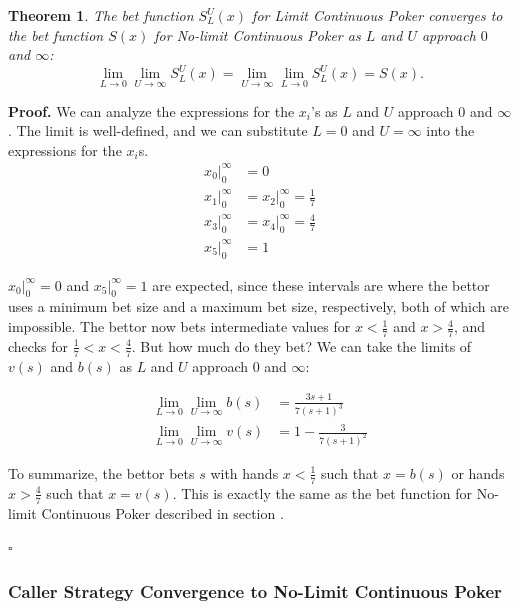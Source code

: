 \documentclass[a4paper,12pt]{article}
\theoremstyle{plain}
\newtheorem{theorem}{Theorem}[section]
\theoremstyle{definition}
\newenvironment{customproof}[1][Proof]{\noindent\textbf{#1.} }{\hfill$\square$\vspace{1em}}
\begin{document}
\begin{theorem}
    The bet function $S_L^U(x)$ for Limit Continuous Poker converges to the bet function $S(x)$ for No-limit Continuous Poker as $L$ and $U$ approach $0$ and $\infty$:
\[
\lim_{L \to 0} \lim_{U \to \infty} S_L^U(x) = \lim_{U \to \infty} \lim_{L \to 0} S_L^U(x) = S(x).
\]
\end{theorem}
\begin{customproof}
We can analyze the expressions for the $x_i$'s as $L$ and $U$ approach $0$ and $\infty$. The limit is well-defined, and we can substitute $L=0$ and $U=\infty$ into the expressions for the $x_i$s.
\begin{align*}
    x_0|_0^\infty &= 0 \\
    x_1|_0^\infty &= x_2|_0^\infty = \frac{1}{7} \\
    x_3|_0^\infty &= x_4|_0^\infty = \frac{4}{7} \\
    x_5|_0^\infty &= 1
\end{align*}

$x_0|_0^\infty = 0$ and $x_5|_0^\infty = 1$ are expected, since these intervals are where the bettor uses a minimum bet size and a maximum bet size, respectively, both of which are impossible. The bettor now bets intermediate values for $x < \frac{1}{7}$ and $x > \frac{4}{7}$, and checks for $\frac{1}{7} < x < \frac{4}{7}$. But how much do they bet? We can take the limits of $v(s)$ and $b(s)$ as $L$ and $U$ approach $0$ and $\infty$:

\begin{align*}
    \lim_{L \to 0} \lim_{U \to \infty} b(s) &= \frac{3 s+1}{7 (s+1)^3}\\
    \lim_{L \to 0} \lim_{U \to \infty} v(s) &= 1 - \frac{3}{7 (s+1)^2}
\end{align*}

To summarize, the bettor bets $s$ with hands $x < \frac{1}{7}$ such that $x = b(s)$ or hands $x > \frac{4}{7}$ such that $x = v(s)$. This is exactly the same as the bet function for No-limit Continuous Poker described in section .

\end{customproof}

\subsubsection{Caller Strategy Convergence to No-Limit Continuous Poker}
\end{document}
